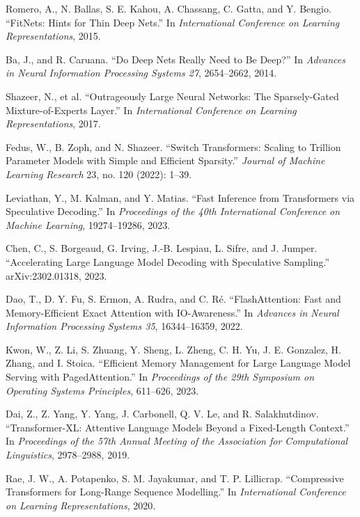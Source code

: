 \documentclass[11pt]{article}
\begin{document}
Romero, A., N. Ballas, S. E. Kahou, A. Chassang, C. Gatta,
and Y. Bengio.
``FitNets: Hints for Thin Deep Nets.''
In \textit{International Conference on Learning Representations}, 2015.

Ba, J., and R. Caruana.
``Do Deep Nets Really Need to Be Deep?''
In \textit{Advances in Neural Information Processing Systems 27},
2654--2662, 2014.

Shazeer, N., et al.
``Outrageously Large Neural Networks: The Sparsely-Gated
Mixture-of-Experts Layer.''
In \textit{International Conference on Learning Representations}, 2017.

Fedus, W., B. Zoph, and N. Shazeer.
``Switch Transformers: Scaling to Trillion Parameter Models with
Simple and Efficient Sparsity.''
\textit{Journal of Machine Learning Research} 23, no. 120 (2022): 1--39.

Leviathan, Y., M. Kalman, and Y. Matias.
``Fast Inference from Transformers via Speculative Decoding.''
In \textit{Proceedings of the 40th International Conference on
Machine Learning}, 19274--19286, 2023.

Chen, C., S. Borgeaud, G. Irving, J.-B. Lespiau,
L. Sifre, and J. Jumper.
``Accelerating Large Language Model Decoding with Speculative Sampling.''
arXiv:2302.01318, 2023.

Dao, T., D. Y. Fu, S. Ermon, A. Rudra, and C. R\'e.
``FlashAttention: Fast and Memory-Efficient Exact Attention with
IO-Awareness.''
In \textit{Advances in Neural Information Processing Systems 35},
16344--16359, 2022.

Kwon, W., Z. Li, S. Zhuang, Y. Sheng, L. Zheng, C. H. Yu,
J. E. Gonzalez, H. Zhang, and I. Stoica.
``Efficient Memory Management for Large Language Model Serving
with PagedAttention.''
In \textit{Proceedings of the 29th Symposium on Operating Systems
Principles}, 611--626, 2023.

Dai, Z., Z. Yang, Y. Yang, J. Carbonell, Q. V. Le, and R. Salakhutdinov.
``Transformer-XL: Attentive Language Models Beyond a Fixed-Length
Context.''
In \textit{Proceedings of the 57th Annual Meeting of the Association
for Computational Linguistics}, 2978--2988, 2019.

Rae, J. W., A. Potapenko, S. M. Jayakumar, and T. P. Lillicrap.
``Compressive Transformers for Long-Range Sequence Modelling.''
In \textit{International Conference on Learning Representations}, 2020.
\end{document}
